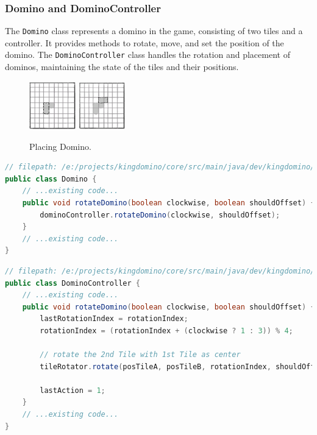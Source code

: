 \documentclass[conference]{IEEEtran}
\begin{document}
\subsubsection{Domino and DominoController}

The \texttt{Domino} class represents a domino in the game, consisting of two
tiles and a controller. It provides methods to rotate, move, and set the
position of the domino. The \texttt{DominoController} class handles the
rotation and placement of dominos, maintaining the state of the tiles and their
positions.

\begin{figure}[htbp]
    \centerline{
        \includegraphics[width=0.18\textwidth]{assets/placing-1.png}
        \hspace{0.01\textwidth}
        \includegraphics[width=0.18\textwidth]{assets/placing-2.png}
    }
    \caption{Placing Domino.}\label{fig:placing}
\end{figure}

\begin{lstlisting}[language=Java]
// filepath: /e:/projects/kingdomino/core/src/main/java/dev/kingdomino/game/Domino.java
public class Domino {
    // ...existing code...
    public void rotateDomino(boolean clockwise, boolean shouldOffset) {
        dominoController.rotateDomino(clockwise, shouldOffset);
    }
    // ...existing code...
}
\end{lstlisting}

\begin{lstlisting}[language=Java]
// filepath: /e:/projects/kingdomino/core/src/main/java/dev/kingdomino/game/DominoController.java
public class DominoController {
    // ...existing code...
    public void rotateDomino(boolean clockwise, boolean shouldOffset) {
        lastRotationIndex = rotationIndex;
        rotationIndex = (rotationIndex + (clockwise ? 1 : 3)) % 4;

        // rotate the 2nd Tile with 1st Tile as center
        tileRotator.rotate(posTileA, posTileB, rotationIndex, shouldOffset);

        lastAction = 1;
    }
    // ...existing code...
}
\end{lstlisting}
\end{document}
